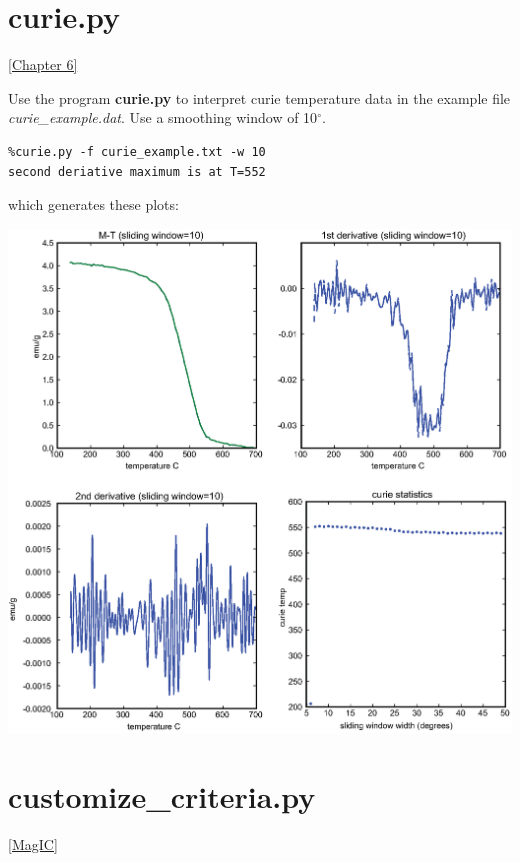 \documentclass[11pt]{book}
\begin{document}
{{{{{%
\section{curie.py} 
\href{http://magician.ucsd.edu/Essentials/WebBook2.html#magnetic_mineralogy}{[Chapter 6]}
\label{ex:curie}

Use the program {\bf curie.py} to interpret curie temperature data in the example file {\it curie\_example.dat}.  Use a smoothing window of 10$^{\circ}$.



\begin{verbatim}
%curie.py -f curie_example.txt -w 10
second deriative maximum is at T=552
\end{verbatim}

\noindent which generates these plots:

{%
  \includegraphics[width=14.5 cm]{EPSfiles/curie-ex.eps}}


\section{customize\_criteria.py} 
\href{#MagIC}{[MagIC]}
\label{ex:customize_criteria}

}}}}}
\end{document}
